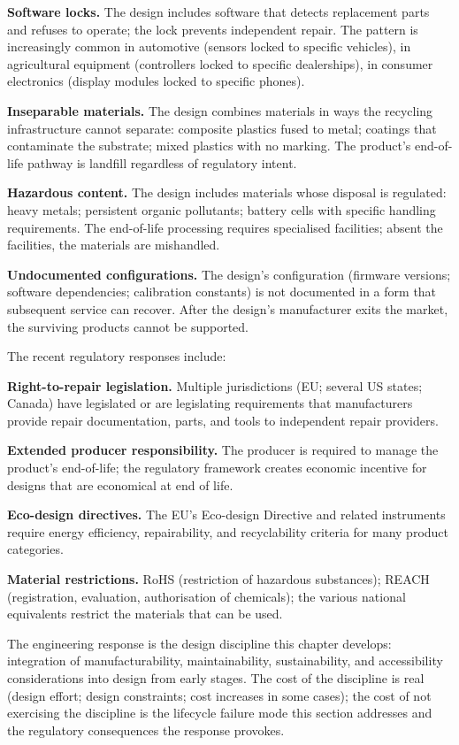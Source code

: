 \textbf{Software locks.} The design includes software that detects replacement parts and refuses to operate; the lock prevents independent repair. The pattern is increasingly common in automotive (sensors locked to specific vehicles), in agricultural equipment (controllers locked to specific dealerships), in consumer electronics (display modules locked to specific phones).

\textbf{Inseparable materials.} The design combines materials in ways the recycling infrastructure cannot separate: composite plastics fused to metal; coatings that contaminate the substrate; mixed plastics with no marking. The product's end-of-life pathway is landfill regardless of regulatory intent.

\textbf{Hazardous content.} The design includes materials whose disposal is regulated: heavy metals; persistent organic pollutants; battery cells with specific handling requirements. The end-of-life processing requires specialised facilities; absent the facilities, the materials are mishandled.

\textbf{Undocumented configurations.} The design's configuration (firmware versions; software dependencies; calibration constants) is not documented in a form that subsequent service can recover. After the design's manufacturer exits the market, the surviving products cannot be supported.

The recent regulatory responses include:

\textbf{Right-to-repair legislation.} Multiple jurisdictions (EU; several US states; Canada) have legislated or are legislating requirements that manufacturers provide repair documentation, parts, and tools to independent repair providers.

\textbf{Extended producer responsibility.} The producer is required to manage the product's end-of-life; the regulatory framework creates economic incentive for designs that are economical at end of life.

\textbf{Eco-design directives.} The EU's Eco-design Directive and related instruments require energy efficiency, repairability, and recyclability criteria for many product categories.

\textbf{Material restrictions.} RoHS (restriction of hazardous substances); REACH (registration, evaluation, authorisation of chemicals); the various national equivalents restrict the materials that can be used.

The engineering response is the design discipline this chapter develops: integration of manufacturability, maintainability, sustainability, and accessibility considerations into design from early stages. The cost of the discipline is real (design effort; design constraints; cost increases in some cases); the cost of not exercising the discipline is the lifecycle failure mode this section addresses and the regulatory consequences the response provokes.

